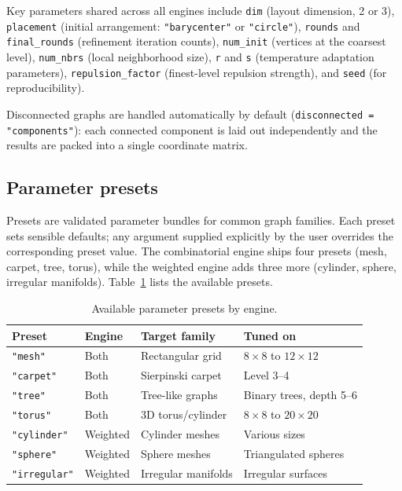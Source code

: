 Key parameters shared across all engines include \texttt{dim} (layout
dimension, 2 or 3), \texttt{placement} (initial arrangement:
\texttt{"barycenter"} or \texttt{"circle"}), \texttt{rounds} and
\texttt{final\_rounds} (refinement iteration counts), \texttt{num\_init}
(vertices at the coarsest level), \texttt{num\_nbrs} (local
neighborhood size), \texttt{r} and \texttt{s} (temperature adaptation
parameters), \texttt{repulsion\_factor} (finest-level repulsion
strength), and \texttt{seed} (for reproducibility).

Disconnected graphs are handled automatically by default
(\texttt{disconnected = "components"}): each connected component is laid
out independently and the results are packed into a single coordinate
matrix.

\subsection{Parameter presets}

Presets are validated parameter bundles for common graph families. Each
preset sets sensible defaults; any argument supplied explicitly by the
user overrides the corresponding preset value. The combinatorial engine
ships four presets (mesh, carpet, tree, torus), while the weighted engine
adds three more (cylinder, sphere, irregular manifolds). Table~\ref{tab:presets}
lists the available presets.

\begin{table}[ht]
\centering
\caption{Available parameter presets by engine.}
\label{tab:presets}
\begin{tabular}{llll}
\toprule
Preset & Engine & Target family & Tuned on \\
\midrule
\texttt{"mesh"} & Both & Rectangular grid & $8 \times 8$ to $12 \times 12$ \\
\texttt{"carpet"} & Both & Sierpinski carpet & Level 3--4 \\
\texttt{"tree"} & Both & Tree-like graphs & Binary trees, depth 5--6 \\
\texttt{"torus"} & Both & 3D torus/cylinder & $8 \times 8$ to $20 \times 20$ \\
\texttt{"cylinder"} & Weighted & Cylinder meshes & Various sizes \\
\texttt{"sphere"} & Weighted & Sphere meshes & Triangulated spheres \\
\texttt{"irregular"} & Weighted & Irregular manifolds & Irregular surfaces \\
\bottomrule
\end{tabular}
\end{table}

